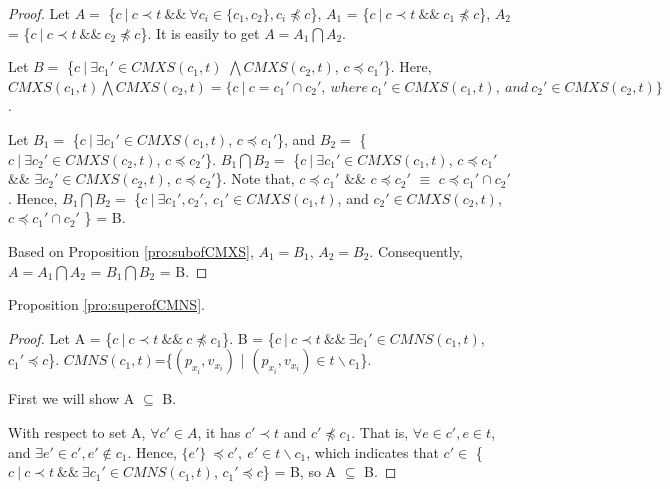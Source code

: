 {\begin{proof}
Let $A = $ \{$c\ |\ c \prec t\ \&\&\ \forall c_{i} \in \{c_{1}, c_{2}\}, c_{i} \npreceq c $\}, $A_{1}$ = \{$c\ |\ c \prec t\ \&\&\  c_{1} \npreceq c $\}, $A_{2}$ = \{$c\ |\ c \prec t\ \&\&\  c_{2} \npreceq c $\}. It is easily to get $A = A_{1} \bigcap A_{2}$.

Let $B = $ \{$ c\ |\ \exists c_{1}' \in CMXS(c_{1}, t)$ $\bigwedge CMXS(c_{2}, t)$, $c \preceq c_{1}'$\}. Here,  $ CMXS(c_{1}, t) \bigwedge CMXS(c_{2}, t) = \{ c\ |\ c = c_{1}' \cap c_{2}',\ where\ c_{1}' \in CMXS(c_{1}, t),\ and\ c_{2}' \in CMXS(c_{2}, t) \}$.

Let $B_{1} = $ \{$ c\ |\ \exists c_{1}' \in CMXS(c_{1}, t)$, $c \preceq c_{1}'$\}, and $B_{2} = $ \{$ c\ |\ \exists c_{2}' \in CMXS(c_{2}, t)$, $c \preceq c_{2}'$\}. $B_{1} \bigcap B_{2} = $ \{$ c\ |\ \exists c_{1}' \in CMXS(c_{1}, t)$, $c \preceq c_{1}'$ \&\& $\exists c_{2}' \in CMXS(c_{2}, t)$, $c \preceq c_{2}'$\}. Note that, $c \preceq c_{1}'$ \&\& $c \preceq c_{2}'$ $\equiv$ $c \preceq c_{1}' \cap c_{2}'$. Hence, $B_{1} \bigcap B_{2} = $ \{$ c\ |\ \exists c_{1}', c_{2}',\  c_{1}' \in CMXS(c_{1}, t)$, and $c_{2}' \in CMXS(c_{2}, t)$, $c \preceq c_{1}' \cap c_{2}'$ \} = B.

Based on Proposition \ref{pro:subofCMXS}, $A_{1} = B_{1}$, $A_{2} = B_{2}$. Consequently,
$A = A_{1} \bigcap A_{2}$ = $B_{1} \bigcap B_{2}$  = B.

\end{proof}

Proposition \ref{pro:superofCMNS}.


\begin{proof}
Let A = \{$c\ |\ c \prec t\ \&\&\ c \npreceq c_{1}$\}. B = \{$ c\ |\ c \prec t \ \&\&\  \exists c_{1}' \in CMNS(c_{1}, t)$, $c_{1}' \preceq c$\}. $CMNS(c_{1},t)$=\{$(p_{x_{i}}, v_{x_{i}})$ | $(p_{x_{i}}, v_{x_{i}}) \in t \backslash c_{1} $\}.

First we will show A $\subseteq$ B.

With respect to set A, $\forall c' \in A$, it has $c' \prec t$ and $c' \npreceq c_{1}$. That is, $\forall e \in c', e \in t$, and  $\exists e' \in c', e' \not\in c_{1}$. Hence, $\{e'\}\ \preceq c',\  e' \in t \backslash c_{1}$, which indicates that $c' \in $ \{$ c\ |\ c \prec t \ \&\&\  \exists c_{1}' \in CMNS(c_{1}, t)$, $c_{1}' \preceq c$\} = B, so A $\subseteq$ B.



\end{proof}}
